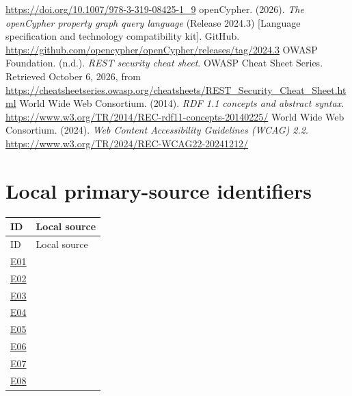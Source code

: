 \documentclass[11pt,a4paper]{article}
\newcommand{\evidence}[1]{\hyperlink{evidence:#1}{#1}}
\begin{document}
\begin{thebibliography}{99}
\url{https://doi.org/10.1007/978-3-319-08425-1_9}
openCypher. (2026). \emph{The openCypher property graph query language} (Release 2024.3) [Language specification and technology compatibility kit]. GitHub.
\url{https://github.com/opencypher/openCypher/releases/tag/2024.3}
OWASP Foundation. (n.d.). \emph{REST security cheat sheet}. OWASP Cheat Sheet Series. Retrieved October 6, 2026, from
\url{https://cheatsheetseries.owasp.org/cheatsheets/REST_Security_Cheat_Sheet.html}
World Wide Web Consortium. (2014). \emph{RDF 1.1 concepts and abstract syntax}.
\url{https://www.w3.org/TR/2014/REC-rdf11-concepts-20140225/}
World Wide Web Consortium. (2024). \emph{Web Content Accessibility Guidelines (WCAG) 2.2}.
\url{https://www.w3.org/TR/2024/REC-WCAG22-20241212/}
\end{thebibliography}

\appendix
\section{Local primary-source identifiers}
{\small
\begin{longtable}{@{}P{1.1cm}P{14.6cm}@{}}
\toprule ID & Local source\\\midrule
\endfirsthead\toprule ID & Local source\\\midrule\endhead
\bottomrule\endlastfoot
\evidence{E01} & \\
\evidence{E02} & \\
\evidence{E03} & \\
\evidence{E04} & \\
\evidence{E05} & \\
\evidence{E06} & \\
\evidence{E07} & \\
\evidence{E08} & \\
\end{longtable}}
\end{document}
